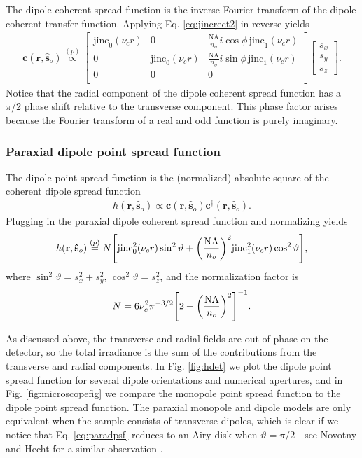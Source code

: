 \documentclass[]{osa-article}
\let\originalleft\left
\let\originalright\right
\renewcommand{\left}{\mathopen{}\mathclose\bgroup\originalleft}
\renewcommand{\right}{\aftergroup\egroup\originalright}
\providecommand{\mb}[1]{\mathbf{#1}}
\providecommand{\so}{\mathbf{\hat{s}}_o}
\begin{document}
 The dipole coherent spread function is the inverse Fourier transform of the
 dipole coherent transfer function. Applying Eq. \eqref{eq:jincrect2} in reverse
 yields
  \begin{align}
   \mb{c}(\mb{r}, \so) \stackrel{(p)}{\propto}
   \begin{bmatrix}
     \text{jinc}_0(\nu_c r)&0&\frac{\text{NA}}{n_o}i\cos\phi\,\text{jinc}_1(\nu_c r)\\
     0&\text{jinc}_0(\nu_c r)&\frac{\text{NA}}{n_o}i\sin\phi\,\text{jinc}_1(\nu_c r)\\
     0&0&0\\     
   \end{bmatrix}
   \begin{bmatrix}
     s_x\\
     s_y\\
     s_z
   \end{bmatrix}.
  \end{align}
  Notice that the radial component of the dipole coherent spread function has a
  $\pi/2$ phase shift relative to the transverse component. This phase factor
  arises because the Fourier transform of a real and odd function is purely
  imaginary.
  
  \subsubsection{Paraxial dipole point spread function}
  The dipole point spread function is the (normalized) absolute square of the
coherent dipole spread function
\begin{align}
  h(\mb{r}, \so) \propto \mb{c}(\mb{r}, \so)\mb{c}^\dagger(\mb{r}, \so). 
\end{align}
Plugging in the paraxial dipole coherent spread function and normalizing yields
\begin{align}
  h(\mb{r}, \so) \stackrel{(p)}{=} N\left[\text{jinc}_0^2(\nu_c r)\sin^2\vartheta + \left(\frac{\text{NA}}{n_o}\right)^2\text{jinc}_1^2(\nu_c r)\cos^2\vartheta\right],\label{eq:paradpsf}
\end{align}
where $\sin^2\vartheta = s_x^2 + s_y^2$, $\cos^2\vartheta = s_z^2$, and the normalization
factor is
\begin{align}
  N = 6\nu_c^2\pi^{-3/2}\left[2 + \left(\frac{\text{NA}}{n_o}\right)^2\right]^{-1}.
\end{align}

As discussed above, the transverse and radial fields are out of phase on the
detector, so the total irradiance is the sum of the contributions from the
transverse and radial components. In Fig. \ref{fig:hdet} we plot the dipole
point spread function for several dipole orientations and numerical apertures,
and in Fig. \ref{fig:microscopefig} we compare the monopole point spread
function to the dipole point spread function. The paraxial monopole and dipole
models are only equivalent when the sample consists of transverse dipoles, which
is clear if we notice that Eq. \eqref{eq:paradpsf} reduces to an Airy disk when
$\vartheta = \pi/2$---see Novotny and Hecht for a similar observation
\cite[ch.~4]{nov2006}.
\end{document}
